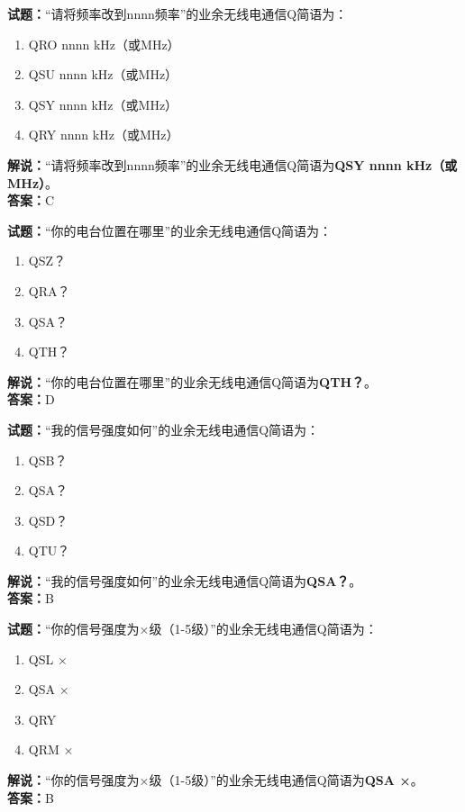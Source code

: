 \documentclass{ctexbook}
\begin{document}
\vspace{1em}

\textbf{试题：}“请将频率改到nnnn频率”的业余无线电通信Q简语为：
\begin{enumerate}[leftmargin=3em]
  \item QRO nnnn \si{\kHz}（或\unit{\MHz}）
  \item QSU nnnn \si{\kHz}（或\unit{\MHz}）
  \item QSY nnnn \si{\kHz}（或\unit{\MHz}）
  \item QRY nnnn \si{\kHz}（或\unit{\MHz}）
\end{enumerate}
\noindent\textbf{解说：}“请将频率改到nnnn频率”的业余无线电通信Q简语为\textbf{QSY nnnn \si{\kHz}（或\unit{\MHz}）}。\\\noindent\textbf{答案：}C

\vspace{1em}

\textbf{试题：}“你的电台位置在哪里”的业余无线电通信Q简语为：
\begin{enumerate}[leftmargin=3em]
  \item QSZ？
  \item QRA？
  \item QSA？
  \item QTH？
\end{enumerate}
\noindent\textbf{解说：}“你的电台位置在哪里”的业余无线电通信Q简语为\textbf{QTH？}。\\\noindent\textbf{答案：}D

\vspace{1em}

\textbf{试题：}“我的信号强度如何”的业余无线电通信Q简语为：
\begin{enumerate}[leftmargin=3em]
  \item QSB？
  \item QSA？
  \item QSD？
  \item QTU？
\end{enumerate}
\noindent\textbf{解说：}“我的信号强度如何”的业余无线电通信Q简语为\textbf{QSA？}。\\\noindent\textbf{答案：}B

\vspace{1em}

\textbf{试题：}“你的信号强度为×级（1-5级）”的业余无线电通信Q简语为：
\begin{enumerate}[leftmargin=3em]
  \item QSL ×
  \item QSA ×
  \item QRY
  \item QRM ×
\end{enumerate}
\noindent\textbf{解说：}“你的信号强度为×级（1-5级）”的业余无线电通信Q简语为\textbf{QSA ×}。\\\noindent\textbf{答案：}B
\end{document}
